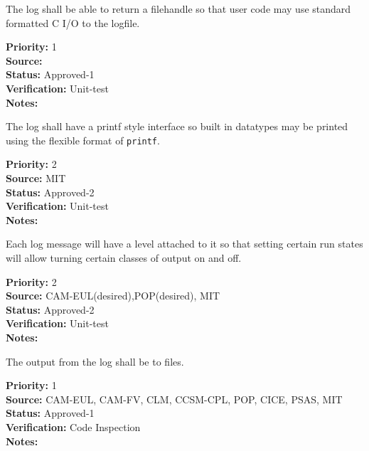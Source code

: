 
The log shall be able to return a filehandle so that user code may use
standard formatted C I/O to the logfile.

\begin{reqlist}
{\bf Priority:} 1 \\
{\bf Source:} \\
{\bf Status:} Approved-1 \\
{\bf Verification:} Unit-test \\
{\bf Notes:} 
\end{reqlist}


The log shall have a printf style interface so built in datatypes may be
printed using the flexible format of {\tt printf}.

\begin{reqlist}
{\bf Priority:} 2 \\
{\bf Source:} MIT \\
{\bf Status:} Approved-2 \\
{\bf Verification:} Unit-test \\
{\bf Notes:} 
\end{reqlist}

Each log message will have a level attached to it so that setting certain run
states will allow turning certain classes of output on and off.

\begin{reqlist}
{\bf Priority:} 2\\
{\bf Source:} CAM-EUL(desired),POP(desired), MIT \\
{\bf Status:} Approved-2 \\
{\bf Verification:} Unit-test \\
{\bf Notes:} 
\end{reqlist}

The output from the log shall be to files.

\begin{reqlist}
{\bf Priority:} 1 \\
{\bf Source:} CAM-EUL, CAM-FV, CLM, CCSM-CPL, POP, CICE, PSAS, MIT  \\
{\bf Status:} Approved-1 \\
{\bf Verification:} Code Inspection \\
{\bf Notes:} 
\end{reqlist}

